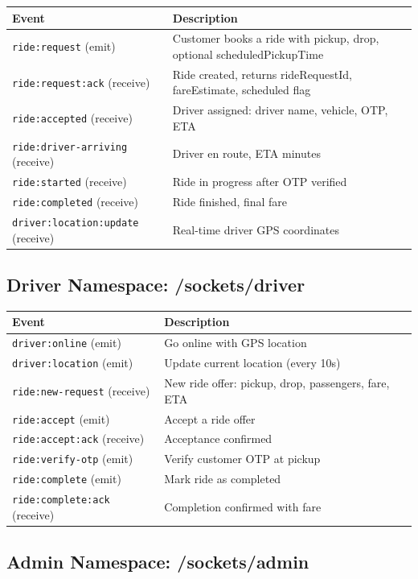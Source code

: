 \documentclass[11pt,a4paper]{article}
\begin{document}
\begin{longtable}{lp{8cm}}
\toprule
\textbf{Event} & \textbf{Description} \\
\midrule
\texttt{ride:request} (emit) & Customer books a ride with pickup, drop, optional scheduledPickupTime \\
\texttt{ride:request:ack} (receive) & Ride created, returns rideRequestId, fareEstimate, scheduled flag \\
\texttt{ride:accepted} (receive) & Driver assigned: driver name, vehicle, OTP, ETA \\
\texttt{ride:driver-arriving} (receive) & Driver en route, ETA minutes \\
\texttt{ride:started} (receive) & Ride in progress after OTP verified \\
\texttt{ride:completed} (receive) & Ride finished, final fare \\
\texttt{driver:location:update} (receive) & Real-time driver GPS coordinates \\
\bottomrule
\end{longtable}

\subsection{Driver Namespace: /sockets/driver}

\begin{longtable}{lp{8cm}}
\toprule
\textbf{Event} & \textbf{Description} \\
\midrule
\texttt{driver:online} (emit) & Go online with GPS location \\
\texttt{driver:location} (emit) & Update current location (every 10s) \\
\texttt{ride:new-request} (receive) & New ride offer: pickup, drop, passengers, fare, ETA \\
\texttt{ride:accept} (emit) & Accept a ride offer \\
\texttt{ride:accept:ack} (receive) & Acceptance confirmed \\
\texttt{ride:verify-otp} (emit) & Verify customer OTP at pickup \\
\texttt{ride:complete} (emit) & Mark ride as completed \\
\texttt{ride:complete:ack} (receive) & Completion confirmed with fare \\
\bottomrule
\end{longtable}

\subsection{Admin Namespace: /sockets/admin}
\end{document}
